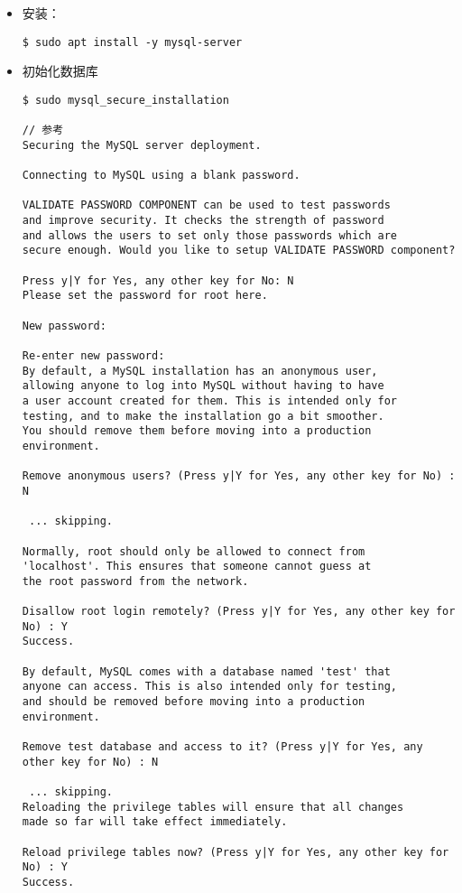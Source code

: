 \begin{itemize}
\item 安装：
\begin{lstlisting}
$ sudo apt install -y mysql-server
\end{lstlisting}

\item 初始化数据库
\begin{lstlisting}
$ sudo mysql_secure_installation

// 参考
Securing the MySQL server deployment.

Connecting to MySQL using a blank password.

VALIDATE PASSWORD COMPONENT can be used to test passwords
and improve security. It checks the strength of password
and allows the users to set only those passwords which are
secure enough. Would you like to setup VALIDATE PASSWORD component?

Press y|Y for Yes, any other key for No: N
Please set the password for root here.

New password: 

Re-enter new password: 
By default, a MySQL installation has an anonymous user,
allowing anyone to log into MySQL without having to have
a user account created for them. This is intended only for
testing, and to make the installation go a bit smoother.
You should remove them before moving into a production
environment.

Remove anonymous users? (Press y|Y for Yes, any other key for No) : N

 ... skipping.

Normally, root should only be allowed to connect from
'localhost'. This ensures that someone cannot guess at
the root password from the network.

Disallow root login remotely? (Press y|Y for Yes, any other key for No) : Y
Success.

By default, MySQL comes with a database named 'test' that
anyone can access. This is also intended only for testing,
and should be removed before moving into a production
environment.

Remove test database and access to it? (Press y|Y for Yes, any other key for No) : N

 ... skipping.
Reloading the privilege tables will ensure that all changes
made so far will take effect immediately.

Reload privilege tables now? (Press y|Y for Yes, any other key for No) : Y
Success.


\end{lstlisting}
\end{itemize}
